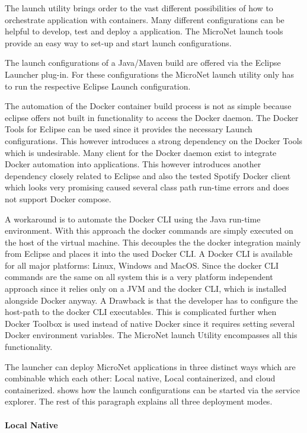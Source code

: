 The launch utility brings order to the vast different possibilities of how to
orchestrate \ms{} application with containers. Many different configurations can
be helpful to develop, test and deploy a \ms{} application. The MicroNet launch
tools provide an easy way to set-up and start launch configurations.

The launch configurations of a Java/Maven build are offered via the Eclipse
Launcher plug-in. For these configurations the MicroNet launch utility only has
to run the respective Eclipse Launch configuration. 

The automation of the Docker container build process is not as simple because
eclipse offers not built in functionality to access the Docker daemon. The
Docker Tools for Eclipse can be used since it provides the necessary Launch
configurations. This however introduces a strong dependency on the Docker Tools
which is undesirable. Many client for the Docker daemon exist to integrate
Docker automation into applications. This however introduces another dependency
closely related to Eclipse and also the tested Spotify Docker client which looks
very promising caused several class path run-time errors and does not support
Docker compose. 

A workaround is to automate the Docker CLI using the Java run-time environment.
With this approach the docker commands are simply executed on the host of the
virtual machine. This decouples the the docker integration mainly from Eclipse
and places it into the used Docker CLI. A Docker CLI is available for all major
platforms: Linux, Windows and MacOS. Since the docker CLI commands are the same
on all system this is a very platform independent approach since it relies only
on a JVM and the docker CLI, which is installed alongside Docker anyway. A
Drawback is that the developer has to configure the host-path to the docker
CLI executables. This is complicated further when Docker Toolbox is used instead
of native Docker since it requires setting several Docker environment variables.
The MicroNet launch Utility encompasses all this functionality.

The launcher can deploy MicroNet applications in three distinct ways which are
combinable which each other: Local native, Local containerized, and cloud
containerized.  shows how the launch
configurations can be started via the service explorer. The rest of this
paragraph explains all three deployment modes.

\paragraph{Local Native}

